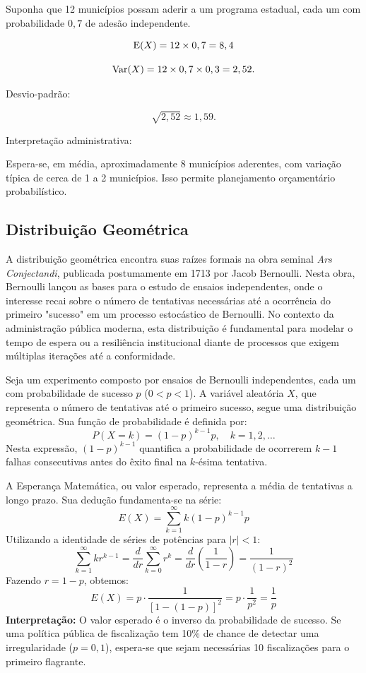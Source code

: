 Suponha que 12 municípios possam aderir a um programa estadual,
cada um com probabilidade $0,7$ de adesão independente.

\[
\operatorname{E}(X)=12\times0,7=8,4
\]

\[
\operatorname{Var}(X)=12\times0,7\times0,3=2,52.
\]

Desvio-padrão:

\[
\sqrt{2,52}\approx1,59.
\]

Interpretação administrativa: \vskip0.3cm

Espera-se, em média, aproximadamente 8 municípios aderentes,
com variação típica de cerca de 1 a 2 municípios.
Isso permite planejamento orçamentário probabilístico.


\newpage
\subsection{Distribuição Geométrica}

A distribuição geométrica encontra suas raízes formais na obra seminal \textit{Ars Conjectandi}, publicada postumamente em 1713 por Jacob Ber\-nou\-lli. Nesta obra, Ber\-nou\-lli lançou as bases para o estudo de ensaios independentes, onde o interesse recai sobre o número de tentativas necessárias até a ocorrência do primeiro "sucesso" em um processo estocástico de Bernoulli. No contexto da administração pública moderna, esta distribuição é fundamental para modelar o tempo de espera ou a resiliência institucional diante de processos que exigem múltiplas iterações até a conformidade.


Seja um experimento composto por ensaios de Bernoulli independentes, cada um com probabilidade de sucesso $p$ ($0 < p < 1$). A variável aleatória $X$, que representa o número de tentativas até o primeiro sucesso, segue uma distribuição geométrica. Sua função de probabilidade é definida por:$$P(X=k)=(1-p)^{k-1}p, \quad k=1,2,\dots$$Nesta expressão, $(1-p)^{k-1}$ quantifica a probabilidade de ocorrerem $k-1$ falhas consecutivas antes do êxito final na $k$-ésima tentativa.



A Esperança Matemática, ou valor esperado, representa a média de tentativas a longo prazo. Sua dedução fundamenta-se na série:$$E(X)=\sum_{k=1}^{\infty} k(1-p)^{k-1}p$$Utilizando a identidade de séries de potências para $|r|<1$:$$\sum_{k=1}^{\infty} k r^{k-1} = \frac{d}{dr} \sum_{k=0}^{\infty} r^k = \frac{d}{dr} \left( \frac{1}{1-r} \right) = \frac{1}{(1-r)^2}$$Fazendo $r=1-p$, obtemos:$$E(X)=p \cdot \frac{1}{[1-(1-p)]^2} = p \cdot \frac{1}{p^2} = \frac{1}{p}$$\textbf{Interpretação:} O valor esperado é o inverso da probabilidade de sucesso. Se uma política pública de fiscalização tem 10\% de chance de detectar uma irregularidade ($p=0,1$), espera-se que sejam necessárias 10 fiscalizações para o primeiro flagrante.


